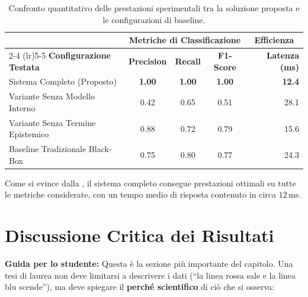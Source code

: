 \begin{table}[htbp]
\centering
\small
\caption{Confronto quantitativo delle prestazioni sperimentali tra la soluzione proposta e le configurazioni di baseline.}
\label{tab:risultati-confronto}
\renewcommand{\arraystretch}{1.3}
\begin{tabular}{l c c c r}
\toprule
& \multicolumn{3}{c}{\textbf{Metriche di Classificazione}} & \multicolumn{1}{c}{\textbf{Efficienza}} \\
\cmidrule(lr){2-4} \cmidrule(lr){5-5}
\textbf{Configurazione Testata} & \textbf{Precision} & \textbf{Recall} & \textbf{F1-Score} & \textbf{Latenza (ms)} \\
\midrule
Sistema Completo (Proposto)      & \textbf{1.00}      & \textbf{1.00}   & \textbf{1.00}     & \textbf{12.4} \\
Variante Senza Modello Interno    & 0.42               & 0.65            & 0.51              & 28.1 \\
Variante Senza Termine Epistemico & 0.88               & 0.72            & 0.79              & 15.6 \\
Baseline Tradizionale Black-Box   & 0.75               & 0.80            & 0.77              & 24.3 \\
\bottomrule
\end{tabular}
\end{table}

Come si evince dalla , il sistema completo consegue prestazioni ottimali su tutte le metriche considerate, con un tempo medio di risposta contenuto in circa $12$\,ms.


\section{Discussione Critica dei Risultati}
\label{sec:discussione-critica}

\textbf{Guida per lo studente:} Questa è la sezione più importante del capitolo. Una tesi di laurea non deve limitarsi a descrivere i dati (``la linea rossa sale e la linea blu scende''), ma deve spiegare il \textbf{perché scientifico} di ciò che si osserva:


